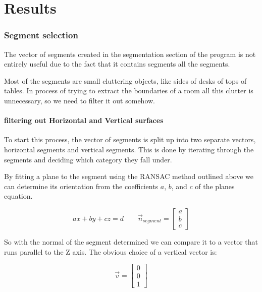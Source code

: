 \chapter{Results}









	\subsection{Segment selection}
		The vector of segments created in the segmentation section of the program is not entirely useful due to the fact that it contains segments all the segments.
		
		Most of the segments are small cluttering objects, like sides of desks of tops of tables. In process of trying to extract the boundaries of a room all this clutter is unnecessary, so we need to filter it out somehow.
		\subsubsection{filtering out Horizontal and Vertical surfaces}
			To start this process, the vector of segments is split up into two separate vectors, horizontal segments and vertical segments. This is done by iterating through the segments and deciding which category they fall under.
			
			By fitting a plane to the segment using the RANSAC method outlined above we can determine its orientation from the coefficients $a$, $b$, and $c$ of the planes equation.
			
			\begin{equation}
			ax + by + cz = d  \quad\quad
			\vec{n}_{segment} = \begin{bmatrix}a\\b\\c\end{bmatrix}
			\end{equation}
			
			So with the normal of the segment determined we can compare it to a vector that runs parallel to the Z axis. The obvious choice of a vertical vector is:
			
			\begin{equation}
			\vec{v} = \begin{bmatrix}0\\0\\1\end{bmatrix}
			\end{equation}
			
